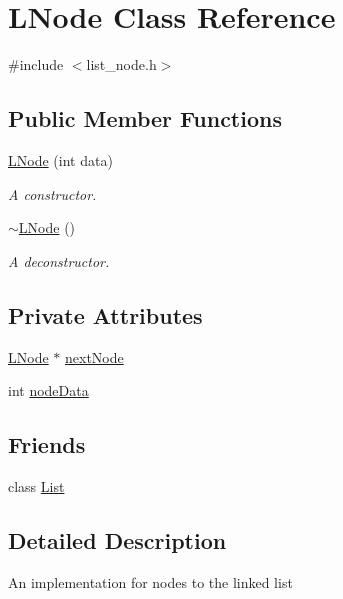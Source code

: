 \hypertarget{class_l_node}{}\section{L\+Node Class Reference}
\label{class_l_node}


{\ttfamily \#include $<$list\+\_\+node.\+h$>$}

\subsection*{Public Member Functions}
\begin{DoxyCompactItemize}
\item 
\hyperlink{class_l_node_ac1e2dab9c211dabbc0dfcaabf3a30f7a}{L\+Node} (int data)
\begin{DoxyCompactList}\small\item\em A constructor. \end{DoxyCompactList}\item 
\hyperlink{class_l_node_a903aa263b8ff2f07ae93935a3e16b23c}{$\sim$\+L\+Node} ()
\begin{DoxyCompactList}\small\item\em A deconstructor. \end{DoxyCompactList}\end{DoxyCompactItemize}
\subsection*{Private Attributes}
\begin{DoxyCompactItemize}
\item 
\hyperlink{class_l_node}{L\+Node} $\ast$ \hyperlink{class_l_node_a4c8c3667cfa6a78673b91fa6a5bb93e6}{next\+Node}
\item 
int \hyperlink{class_l_node_a97c342a895b9c19e6a279acfe2c5d05c}{node\+Data}
\end{DoxyCompactItemize}
\subsection*{Friends}
\begin{DoxyCompactItemize}
\item 
class \hyperlink{class_l_node_a8cee552d09eaeb60a09d95309a87b498}{List}
\end{DoxyCompactItemize}


\subsection{Detailed Description}
An implementation for nodes to the linked list 

